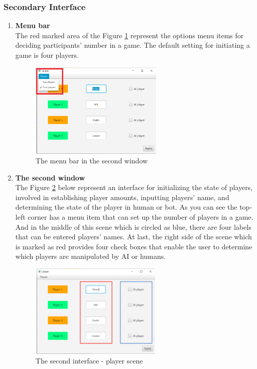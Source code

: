\newpage
\subsubsection{Secondary Interface}

\begin{enumerate}
	\item\textbf{Menu bar}\\
	The red marked area of the Figure \ref{fig:secondWindowMenu} represent the options menu items for deciding participants' number in a game. The default setting for initiating a game is four players.
	
	\begin{figure}[h]
		\centering
		\includegraphics[width=0.6\textwidth]{image/secondWindowMenu}
		\caption{The menu bar in the second window}
		\label{fig:secondWindowMenu}
	\end{figure}
	
	
	
	\item\textbf{The second window}\\
	The Figure \ref{fig:playerScene} below represent an interface for initializing the state of players, involved in establishing player amounts, inputting players' name, and determining the state of the player in human or bot. As you can see the top-left corner has a menu item that can set up the number of players in a game. And in the middle of this scene which is circled as blue, there are four labels that can be entered players' names. At last, the right side of the scene which is marked as red provides four check boxes that enable the user to determine which players are manipulated by AI or humans.  
	
	\begin{figure}[h]
		\centering
		\includegraphics[width=0.6\textwidth]{image/Player scene}
		\caption{The second interface - player scene}
		\label{fig:playerScene}
	\end{figure}
\end{enumerate}

\newpage